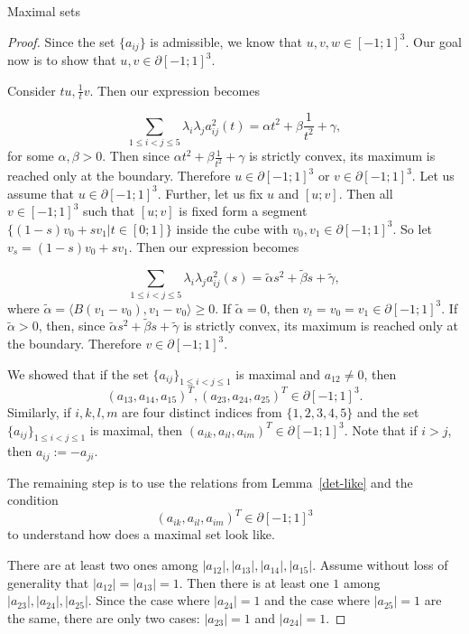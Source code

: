 \documentclass[12pt]{article}
\begin{document}
\begin{section}{Maximal sets}
\begin{proof}
        Since the set $\{a_{ij}\}$ is admissible, we know that $u,v,w \in [-1;1]^{3}.$ Our goal now is to show that $u,v \in \partial [-1;1]^{3}.$ 
    
        Consider $tu, \frac{1}{t}v$. Then our expression becomes
    
        $$
            \sum_{1\leq i < j\leq 5}\lambda_{i}\lambda_{j} a_{ij}^{2}(t) = \alpha t^2 + \beta \frac{1}{t^2} + \gamma,
        $$
        for some $\alpha, \beta > 0.$ Then since $\alpha t^2 + \beta \frac{1}{t^2} + \gamma$ is strictly convex, its maximum is reached only  at the boundary. Therefore $u \in \partial [-1;1]^{3}$ or $v \in \partial [-1;1]^{3}.$ Let us assume that $u\in\partial [-1;1]^{3}.$ Further, let us fix $u$ and $[u;v]$. Then all $v\in [-1;1]^3$ such that $[u;v]$ is fixed form a segment $\{(1-s)v_{0} + sv_{1}| t\in [0;1]\}$ inside the cube with $v_{0},v_{1}\in \partial[-1;1]^{3}.$ So let $v_{s} = (1-s)v_{0} + sv_{1}. $ Then our expression becomes
    
        $$
            \sum_{1\leq i < j\leq 5}\lambda_{i}\lambda_{j} a_{ij}^{2}(s) = \tilde{\alpha} s^2 + \tilde{\beta}s + \tilde{\gamma},
        $$
        where  $\tilde{\alpha} = \langle B(v_{1}-v_{0}), v_{1}-v_{0}\rangle \geq 0. $ If $\tilde{\alpha} = 0$, then $v_{t}=v_{0}=v_{1}\in\partial[-1;1]^{3}$. If $\tilde{\alpha}>0$,  then, since $\tilde{\alpha} s^2 + \tilde{\beta}s + \tilde{\gamma}$ is strictly convex, its maximum is reached only  at the boundary. Therefore $v \in \partial [-1;1]^{3}$.
    
        We showed that if the set $\{a_{ij}\}_{1\leq i < j \leq 1}$ is maximal and $a_{12}\neq 0$, then $$
            (a_{13}, a_{14}, a_{15})^{T}, (a_{23},a_{24},a_{25})^{T} \in \partial [-1;1]^{3}. 
        $$ 
        Similarly, if $i,k,l,m$ are four distinct indices from $\{1,2,3,4,5\}$ and the set $\{a_{ij}\}_{1\leq i < j \leq 1}$ is maximal, then $(a_{ik}, a_{il},a_{im})^{T} \in \partial [-1;1]^{3}$. Note that if $i>j$, then $a_{ij}:=-a_{ji}$.
    
        The remaining step is to use the relations from Lemma~\ref{det-like} and the condition $$(a_{ik}, a_{il},a_{im})^{T} \in \partial [-1;1]^{3}$$ to understand how does a maximal set look like.
    
        There are at least two ones among $|a_{12}|,|a_{13}|,|a_{14}|,|a_{15}|$. Assume without loss of generality that  $|a_{12}|=|a_{13}|=1.$ Then there is at least one $1$ among $|a_{23}|, |a_{24}|,|a_{25}|$. Since the case where $|a_{24}|=1$ and the case where $|a_{25}|=1$ are the same, there are only two cases: $|a_{23}|=1$ and $|a_{24}|=1.$
    

\end{proof}
\end{section}
\end{document}
